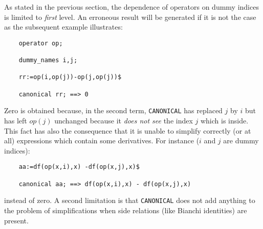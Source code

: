 As stated in the previous section, the dependence of operators on dummy 
indices is limited to {\em first} level. An erroneous result
will be generated if it is not the case as the subsequent example 
illustrates:
\begin{verbatim}
    operator op;

    dummy_names i,j;

    rr:=op(i,op(j))-op(j,op(j))$

    canonical rr; ==> 0
\end{verbatim}
Zero is obtained because, in the second term, {\tt CANONICAL} has replaced 
$j$ by $i$ but has left $op(j)$ unchanged because it {\em does not see}
the index $j$ which is inside. This fact has also the consequence that 
it is unable to simplify correctly (or at all) expressions which 
contain some derivatives.
For instance ($i$ and $j$ are dummy indices):
\begin{verbatim}
    aa:=df(op(x,i),x) -df(op(x,j),x)$

    canonical aa; ==> df(op(x,i),x) - df(op(x,j),x)
\end{verbatim} 
instead of zero.
A second limitation is that {\tt CANONICAL} does not add anything to the
 problem of simplifications when side relations (like Bianchi identities) 
are present.
